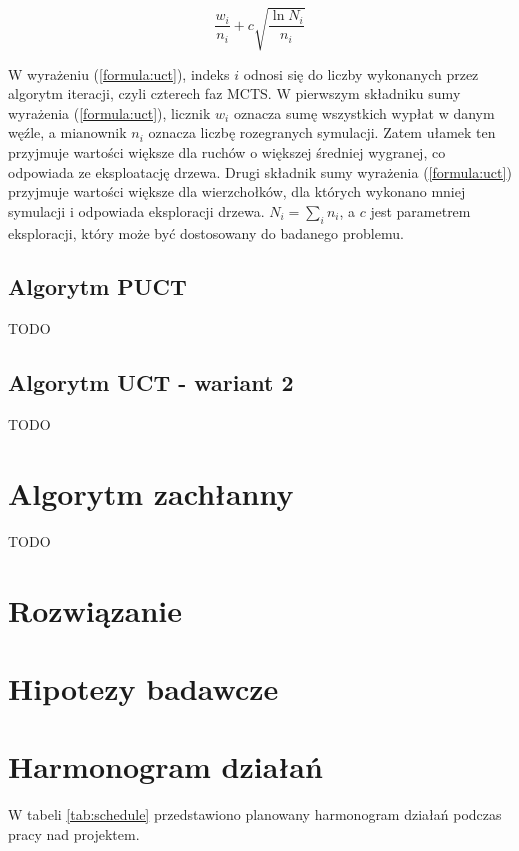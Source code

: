 \documentclass[a4paper,12pt]{article}
\let\oldsection\section
\renewcommand\section{\clearpage\oldsection}
\begin{document}
\begin{equation}\label{formula:uct}
\frac{w_i}{n_i} + c \sqrt{\frac{\ln N_i}{n_i}}
\end{equation}

W wyrażeniu (\ref{formula:uct}), indeks $i$ odnosi się do liczby wykonanych przez algorytm iteracji, czyli czterech faz MCTS. W pierwszym składniku sumy wyrażenia (\ref{formula:uct}), licznik $w_i$ oznacza sumę wszystkich wypłat w danym węźle, a mianownik $n_i$ oznacza liczbę rozegranych symulacji. Zatem ułamek ten przyjmuje wartości większe dla ruchów o większej średniej wygranej, co odpowiada ze eksploatację drzewa. Drugi składnik sumy wyrażenia (\ref{formula:uct}) przyjmuje wartości większe dla wierzchołków, dla których wykonano mniej symulacji i odpowiada eksploracji drzewa. $N_i=\sum_i n_i$, a $c$ jest parametrem eksploracji, który może być dostosowany do badanego problemu.


\subsection{Algorytm PUCT} 
TODO


\subsection{Algorytm UCT - wariant 2}
TODO


\section{Algorytm zachłanny}
TODO



\section{Rozwiązanie}


\section{Hipotezy badawcze}



\section{Harmonogram działań}
W tabeli \ref{tab:schedule} przedstawiono planowany harmonogram działań podczas pracy nad projektem.
\end{document}
